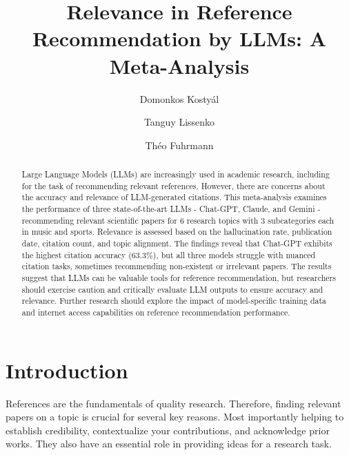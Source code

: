 \documentclass[runningheads]{llncs}
\begin{document}
\title{Relevance in Reference Recommendation by LLMs: A Meta-Analysis}
\author{Domonkos Kostyál \and Tanguy Lissenko \and Théo Fuhrmann}


\maketitle

\begin{abstract}

Large Language Models (LLMs) are increasingly used in academic research, including for the task of recommending relevant references. However, there are concerns about the accuracy and relevance of LLM-generated citations. This meta-analysis examines the performance of three state-of-the-art LLMs - Chat-GPT, Claude, and Gemini - recommending relevant scientific papers for 6 research topics with 3 subcategories each in music and sports. Relevance is assessed based on the hallucination rate, publication date, citation count, and topic alignment. The findings reveal that Chat-GPT exhibits the highest citation accuracy (63.3\%), but all three models struggle with nuanced citation tasks, sometimes recommending non-existent or irrelevant papers. The results suggest that LLMs can be valuable tools for reference recommendation, but researchers should exercise caution and critically evaluate LLM outputs to ensure accuracy and relevance. Further research should explore the impact of model-specific training data and internet access capabilities on reference recommendation performance.


\end{abstract}

\section{Introduction}

References are the fundamentals of quality research.
Therefore, finding relevant papers on a topic is crucial for several key reasons. Most importantly helping to establish credibility, contextualize your contributions, and acknowledge prior works. They also have an essential role in providing ideas for a research task.
\end{document}
